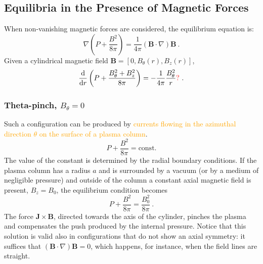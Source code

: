 \documentclass[12pt,a4paper]{article}
\renewcommand{\vec}[1]{\boldsymbol{#1}}
\newcommand{\dif}{\mathrm{d}}
\begin{document}
\subsection{Equilibria in the Presence of Magnetic Forces}
When non-vanishing magnetic forces are considered, the equilibrium equation is:
\begin{equation}
\nabla \left(P + \frac{B^2}{8\pi} \right) = \frac{1}{4\pi} (\vec{B}\cdot \nabla) \vec{B} ~.
\end{equation}
Given a cylindrical magnetic field $\vec{B} = [0, B_\theta (r ), B_z (r )]$, 
\begin{equation}
\dfrac{\dif }{\dif r} \left(P + \frac{B_\theta^2+B_z^2}{8\pi} \right) = - \frac{1}{4\pi} \frac{B_\theta^2}{r} \textcolor{red}{?} ~. 
\end{equation}

\subsubsection{Theta-pinch, $B_\theta = 0$}
Such a configuration can be produced by \textcolor{orange}{currents flowing in the azimuthal direction $\theta$ on the surface of a plasma column}.
\begin{equation*}
P + \frac{B^2}{8\pi} = \text{const.} 
\end{equation*}
The value of the constant is determined by the radial boundary conditions. If the plasma column has a radius $a$ and is surrounded by a vacuum (or by a medium of negligible pressure) and outside of the column a constant axial magnetic field is present, $B_z = B_0$, the equilibrium condition becomes
\begin{equation*}
P + \frac{B^2}{8\pi} = \frac{B_0^2}{8\pi} ~.
\end{equation*}
The force $\vec{J}\times \vec{B}$, directed towards the axis of the cylinder, pinches the plasma and compensates the push produced by the internal pressure. Notice that this solution is valid also in configurations that do not show an axial symmetry: it suffices that $(\vec{B}\cdot \nabla)\vec{B} = 0$, which happens, for instance, when the field lines are straight.
\end{document}
